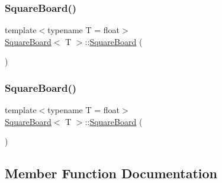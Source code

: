 \mbox{\label{classSquareBoard_a23c495a2419aded87c0b2803de409b5e}} 
\subsubsection{\texorpdfstring{Square\+Board()}{SquareBoard()}\hspace{0.1cm}{\footnotesize\ttfamily [5/6]}}
{\footnotesize\ttfamily template$<$typename T  = float$>$ \\
\mbox{\hyperlink{classSquareBoard}{Square\+Board}}$<$ T $>$\+::\mbox{\hyperlink{classSquareBoard}{Square\+Board}} (\begin{DoxyParamCaption}\item[{\mbox{\hyperlink{classSquareBoard}{Square\+Board}}$<$ T $>$ \&\&}]{ }\end{DoxyParamCaption})\hspace{0.3cm}{\ttfamily [default]}}

\mbox{\label{classSquareBoard_a9a6c27e98ae10d6cb601140ef6a3ff59}} 
\subsubsection{\texorpdfstring{Square\+Board()}{SquareBoard()}\hspace{0.1cm}{\footnotesize\ttfamily [6/6]}}
{\footnotesize\ttfamily template$<$typename T  = float$>$ \\
\mbox{\hyperlink{classSquareBoard}{Square\+Board}}$<$ T $>$\+::\mbox{\hyperlink{classSquareBoard}{Square\+Board}} (\begin{DoxyParamCaption}\item[{const \mbox{\hyperlink{classSquareBoard}{Square\+Board}}$<$ T $>$ \&}]{ }\end{DoxyParamCaption})\hspace{0.3cm}{\ttfamily [default]}}



\subsection{Member Function Documentation}
\mbox{\label{classSquareBoard_a5d12432cc063275a6ffec42a7971abbc}} 
